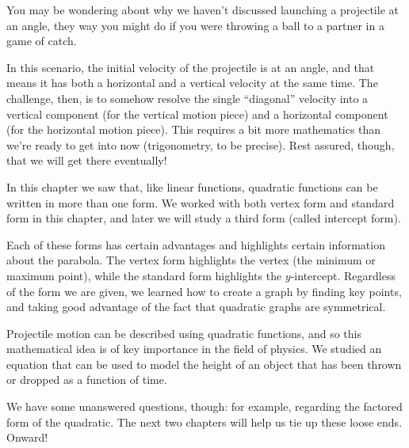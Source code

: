 You may be wondering about why we haven't discussed launching a projectile at an angle, they way you might do if you were throwing a ball to a partner in a game of catch.

In this scenario, the initial velocity of the projectile is at an angle, and that means it has both a horizontal and a vertical velocity at the same time. The challenge, then, is to somehow resolve the single ``diagonal'' velocity into a vertical component (for the vertical motion piece) and a horizontal component (for the horizontal motion piece). This requires a bit more mathematics than we're ready to get into now (trigonometry, to be precise). Rest assured, though, that we will get there eventually!


\chaptersummary

In this chapter we saw that, like linear functions, quadratic functions can be written in more than one form. We worked with both vertex form and standard form in this chapter, and later we will study a third form (called intercept form).

Each of these forms has certain advantages and highlights certain information about the parabola. The vertex form highlights the vertex (the minimum or maximum point), while the standard form highlights the $y$-intercept. Regardless of the form we are given, we learned how to create a graph by finding key points, and taking good advantage of the fact that quadratic graphs are symmetrical.

Projectile motion can be described using quadratic functions, and so this mathematical idea is of key importance in the field of physics. We studied an equation that can be used to model the height of an object that has been thrown or dropped as a function of time.

We have some unanswered questions, though: for example, regarding the factored form of the quadratic. The next two chapters will help us tie up these loose ends. Onward!